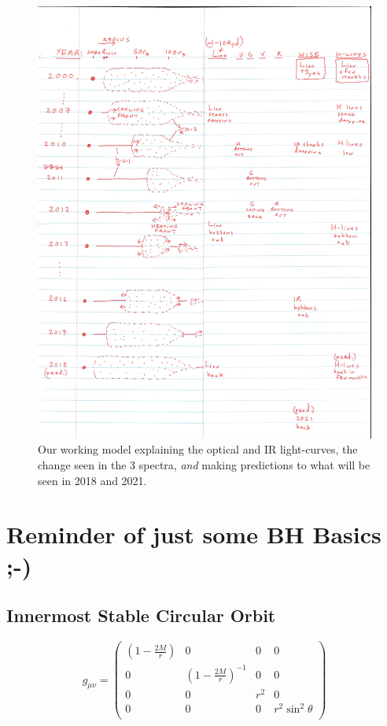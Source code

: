 \documentclass[11pt,a4paper]{article}
\begin{document}
\begin{figure}
  \centering
  \includegraphics[width=16.00cm, trim=0.0cm 0.0cm 0.0cm 0.0cm, clip] 
  {simple_model.pdf}
  \caption[]{
Our working model explaining the optical and IR light-curves, the
change seen in the 3 spectra, {\it and} making predictions to what
will be seen in 2018 and 2021.
}
  \label{fig:redink}
\end{figure}



\iffalse
\newpage
\section{Reminder of just some BH Basics ;-)} 

\subsection{Innermost Stable Circular Orbit}
\begin{equation}
g_{\mu \nu} = 
\begin{pmatrix}
(1- \frac{2M}{r})   & 0                                  & 0         & 0  \\ 
0                          & (1- \frac{2M}{r})^{-1}    & 0         & 0 \\ 
0                          & 0                                  & r^{2}   & 0 \\ 
0                          & 0                                  & 0         & r^2 \sin^2\theta\\
\end{pmatrix}
\end{equation}
\end{document}
